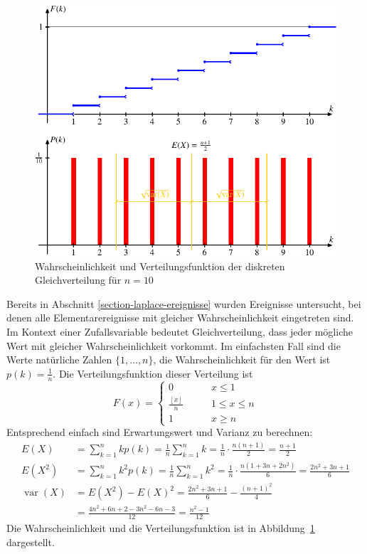\begin{figure}
\centering
\includegraphics{images/gl-2.pdf}
\caption{Wahrscheinlichkeit und Verteilungsfunktion der diskreten Gleichverteilung
für $n=10$
\label{graph-diskrete-gleichverteilung}}
\end{figure}

Bereits in Abschnitt \ref{section-laplace-ereignisse}
wurden Ereignisse
untersucht, bei denen alle Elementarereignisse mit gleicher Wahrscheinlichkeit
eingetreten sind.
Im Kontext einer Zufallsvariable bedeutet
Gleichverteilung, dass jeder mögliche Wert mit gleicher Wahrscheinlichkeit
vorkommt.
Im einfachsten Fall sind die Werte natürliche Zahlen
$\{1,\dots,n\}$, die Wahrscheinlichkeit für den Wert ist 
$p(k)=\frac1n$.
Die Verteilungsfunktion dieser Verteilung ist
\[
F(x)=
\begin{cases}
0&\qquad x \le 1\\
{\displaystyle \frac{\left\lfloor x\right\rfloor}n}&\qquad 1\le x\le n\\
1&\qquad x \ge n
\end{cases}
\]
Entsprechend einfach sind Erwartungswert und Varianz zu berechnen:
{\allowdisplaybreaks
\begin{align*}
E(X)&=\sum_{k=1}^nkp(k)=\frac1n\sum_{k=1}^nk=\frac1n\cdot\frac{n(n+1)}{2}=\frac{n+1}2\\
E(X^2)&=\sum_{k=1}^nk^2p(k)=\frac1n\sum_{k=1}^nk^2=\frac1n\cdot\frac{n(1+3n+2n^2)}{6}=\frac{2n^2+3n+1}{6}\\
\operatorname{var}(X)&=E(X^2)-E(X)^2=\frac{2n^2+3n+1}{6}-\frac{(n+1)^2}4\\
&=\frac{4n^2+6n+2-3n^2-6n-3}{12}=\frac{n^2-1}{12}
\end{align*}
}
Die Wahrscheinlichkeit und die Verteilungsfunktion ist in
Abbildung~\ref{graph-diskrete-gleichverteilung} dargestellt.

